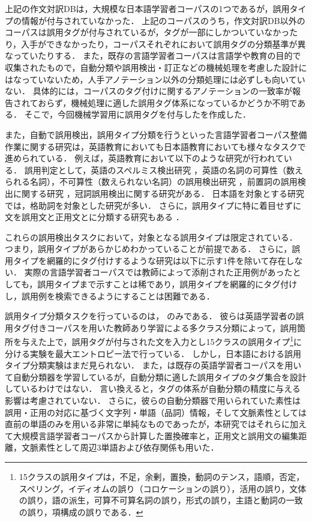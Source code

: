 \documentclass[japanese]{jnlp_1.4}
\newcommand{\ngc}{}
\begin{document}
上記の作文対訳DBは，大規模な日本語学習者コーパスの1つであるが，誤用タイプの情報が付与されていなかった．
上記のコーパスのうち，作文対訳DB以外のコーパスは誤用タグが付与されているが，タグが一部にしかついていなかったり，入手ができなかったり，コーパスそれぞれにおいて誤用タグの分類基準が異なっていたりする．
また，既存の言語学習者コーパスは言語学や教育の目的で収集されたもので，自動分類や誤用検出・訂正などの機械処理を考慮した設計にはなっていないため，人手アノテーション以外の分類処理には必ずしも向いていない．
具体的には，コーパスのタグ付けに関するアノテーションの一致率が報告されておらず，機械処理に適した誤用タグ体系になっているかどうか不明である．
そこで，今回機械学習用に誤用タグを付与した\ngc\hbox{}を作成した．

また，自動で誤用検出，誤用タイプ分類を行うといった言語学習者コーパス整備作業に関する研究は，英語教育においても日本語教育においても様々なタスクで進められている．
例えば，英語教育において以下のような研究が行われている．
誤用判定として，英語のスペルミス検出研究 \cite{wilcox}，英語の名詞の可算性（数えられる名詞），不可算性（数えられない名詞）の誤用検出研究 \cite{brockett,nagata06j}，前置詞の誤用検出に関する研究 \cite{chodorow07,deFelice07,defelice08,joel,gamon}，冠詞誤用検出に関する研究\cite{han,defelice08,gamon,yi,nagata05j}がある．
日本語を対象とする研究では，格助詞を対象とした研究が多い\cite{ookij,oyama/08,imaedaj,nampoj,suzuki/06b,Imamura:ErrorCorrection2012j}．
さらに，誤用タイプに特に着目せずに文を誤用文と正用文とに分類する研究もある \cite{sun,mizumotoj/13}．

これらの誤用検出タスクにおいて，対象となる誤用タイプは限定されている．
つまり，誤用タイプがあらかじめわかっていることが前提である．
さらに，誤用タイプを網羅的にタグ付けするような研究は以下に示す1件を除いて存在しない．
実際の言語学習者コーパスでは教師によって添削された正用例があったとしても，誤用タイプまで示すことは稀であり，誤用タイプを網羅的にタグ付けし，誤用例を検索できるようにすることは困難である．

誤用タイプ分類タスクを行っているのは， のみである．
彼らは英語学習者の誤用タグ付きコーパスを用いた教師あり学習による多クラス分類によって，誤用箇所を与えた上で，誤用タグが付与された文を入力とし15クラスの誤用タイプ\footnote{15クラスの誤用タイプは，不足，余剰，置換，動詞のテンス，語順，否定，スペリング，イディオムの誤り（コロケーションの誤り），活用の誤り，文体の誤り，語の派生，可算不可算名詞の誤り，形式の誤り，主語と動詞の一致の誤り，項構成の誤りである．}に分ける実験を最大エントロピー法で行っている．
しかし，日本語における誤用タイプ分類実験はまだ見られない．
また，は既存の英語学習者コーパスを用いて自動分類器を学習しているが，自動分類に適した誤用タイプのタグ集合を設計しているわけではない．
言い換えると，タグの体系が自動分類の精度に与える影響は考慮されていない．
さらに，彼らの自動分類器で用いられていた素性は誤用・正用の対応に基づく文字列・単語（品詞）情報，そして文脈素性としては直前の単語のみを用いる非常に単純なものであったが，本研究ではそれらに加えて大規模言語学習者コーパスから計算した置換確率と，正用文と誤用文の編集距離，文脈素性として周辺3単語および依存関係も用いた．
\end{document}
